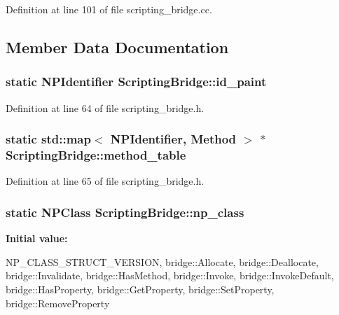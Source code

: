 Definition at line 101 of file scripting\_\-bridge.cc.



\subsection{Member Data Documentation}
\hypertarget{classbridge_1_1_scripting_bridge_af9fe1c1d57b6fb113b2e0da63128807d}{
\subsubsection[{id\_\-paint}]{\setlength{\rightskip}{0pt plus 5cm}static NPIdentifier {\bf ScriptingBridge::id\_\-paint}}}
\label{classbridge_1_1_scripting_bridge_af9fe1c1d57b6fb113b2e0da63128807d}


Definition at line 64 of file scripting\_\-bridge.h.

\hypertarget{classbridge_1_1_scripting_bridge_a1057c4c6b923babcbc62a5732d2c3235}{
\subsubsection[{method\_\-table}]{\setlength{\rightskip}{0pt plus 5cm}static std::map$<$ NPIdentifier, {\bf Method} $>$ $\ast$ {\bf ScriptingBridge::method\_\-table}}}
\label{classbridge_1_1_scripting_bridge_a1057c4c6b923babcbc62a5732d2c3235}


Definition at line 65 of file scripting\_\-bridge.h.

\hypertarget{classbridge_1_1_scripting_bridge_a7a3e8318e9e315a116729cebceac5fd9}{
\subsubsection[{np\_\-class}]{\setlength{\rightskip}{0pt plus 5cm}static NPClass {\bf ScriptingBridge::np\_\-class}}}
\label{classbridge_1_1_scripting_bridge_a7a3e8318e9e315a116729cebceac5fd9}
{\bfseries Initial value:}
\begin{DoxyCode}
 {
  NP_CLASS_STRUCT_VERSION,
  bridge::Allocate,
  bridge::Deallocate,
  bridge::Invalidate,
  bridge::HasMethod,
  bridge::Invoke,
  bridge::InvokeDefault,
  bridge::HasProperty,
  bridge::GetProperty,
  bridge::SetProperty,
  bridge::RemoveProperty
}
\end{DoxyCode}


